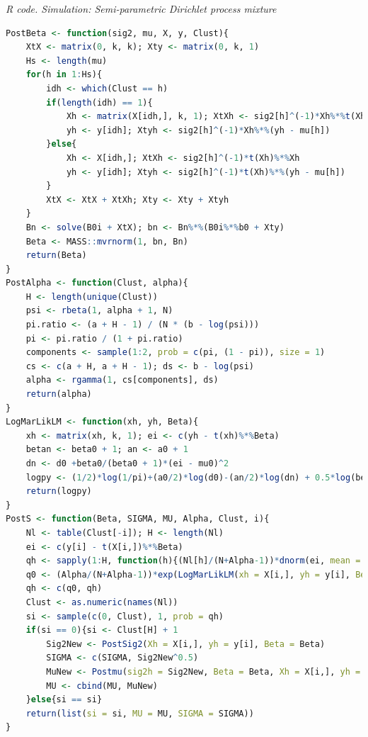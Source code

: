 \begin{enumerate}[leftmargin=*]
\begin{tcolorbox}[enhanced,width=4.67in,center upper,
	fontupper=\large\bfseries,drop shadow southwest,sharp corners]
	\textit{R code. Simulation: Semi-parametric Dirichlet process mixture}
	\begin{VF}
		\begin{lstlisting}[language=R]
PostBeta <- function(sig2, mu, X, y, Clust){
	XtX <- matrix(0, k, k); Xty <- matrix(0, k, 1)
	Hs <- length(mu)
	for(h in 1:Hs){
		idh <- which(Clust == h)
		if(length(idh) == 1){
			Xh <- matrix(X[idh,], k, 1); XtXh <- sig2[h]^(-1)*Xh%*%t(Xh)
			yh <- y[idh]; Xtyh <- sig2[h]^(-1)*Xh%*%(yh - mu[h])
		}else{
			Xh <- X[idh,]; XtXh <- sig2[h]^(-1)*t(Xh)%*%Xh
			yh <- y[idh]; Xtyh <- sig2[h]^(-1)*t(Xh)%*%(yh - mu[h])
		}
		XtX <- XtX + XtXh; Xty <- Xty + Xtyh
	}
	Bn <- solve(B0i + XtX); bn <- Bn%*%(B0i%*%b0 + Xty)
	Beta <- MASS::mvrnorm(1, bn, Bn)
	return(Beta)
}
PostAlpha <- function(Clust, alpha){
	H <- length(unique(Clust))
	psi <- rbeta(1, alpha + 1, N)
	pi.ratio <- (a + H - 1) / (N * (b - log(psi)))
	pi <- pi.ratio / (1 + pi.ratio)
	components <- sample(1:2, prob = c(pi, (1 - pi)), size = 1)
	cs <- c(a + H, a + H - 1); ds <- b - log(psi)
	alpha <- rgamma(1, cs[components], ds)
	return(alpha)
}
LogMarLikLM <- function(xh, yh, Beta){
	xh <- matrix(xh, k, 1); ei <- c(yh - t(xh)%*%Beta)
	betan <- beta0 + 1; an <- a0 + 1
	dn <- d0 +beta0/(beta0 + 1)*(ei - mu0)^2  
	logpy <- (1/2)*log(1/pi)+(a0/2)*log(d0)-(an/2)*log(dn) + 0.5*log(beta0/betan) + lgamma(an/2)-lgamma(a0/2)
	return(logpy)
}
PostS <- function(Beta, SIGMA, MU, Alpha, Clust, i){
	Nl <- table(Clust[-i]); H <- length(Nl)
	ei <- c(y[i] - t(X[i,])%*%Beta)
	qh <- sapply(1:H, function(h){(Nl[h]/(N+Alpha-1))*dnorm(ei, mean = MU[h], sd = SIGMA[h])})
	q0 <- (Alpha/(N+Alpha-1))*exp(LogMarLikLM(xh = X[i,], yh = y[i], Beta = Beta))
	qh <- c(q0, qh)
	Clust <- as.numeric(names(Nl))
	si <- sample(c(0, Clust), 1, prob = qh)
	if(si == 0){si <- Clust[H] + 1
		Sig2New <- PostSig2(Xh = X[i,], yh = y[i], Beta = Beta)
		SIGMA <- c(SIGMA, Sig2New^0.5)
		MuNew <- Postmu(sig2h = Sig2New, Beta = Beta, Xh = X[i,], yh = y[i])
		MU <- cbind(MU, MuNew)
	}else{si == si}
	return(list(si = si, MU = MU, SIGMA = SIGMA))
}
\end{lstlisting}
	\end{VF}
\end{tcolorbox}


\end{enumerate}
